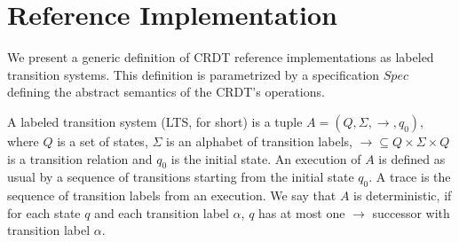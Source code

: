 
\section{Reference Implementation}
\label{sec:reference implementation}


We present a generic definition of CRDT reference implementations as labeled transition systems. This definition is parametrized by a specification $Spec$ defining the abstract semantics of the CRDT's operations.

A labeled transition system (LTS, for short) is a tuple $A = (Q,\Sigma,\rightarrow,q_0)$, where $Q$ is a set of states, $\Sigma$ is an alphabet of transition labels, $\rightarrow \subseteq Q \times \Sigma \times Q$ is a transition relation and $q_0$ is the initial state. An execution of $A$ is defined as usual by a sequence of transitions starting from the initial state $q_0$. A trace is the sequence of transition labels from an execution. We say that $A$ is deterministic, if for each state $q$ and each transition label $\alpha$, $q$ has at most one $\rightarrow$ successor with transition label $\alpha$.


